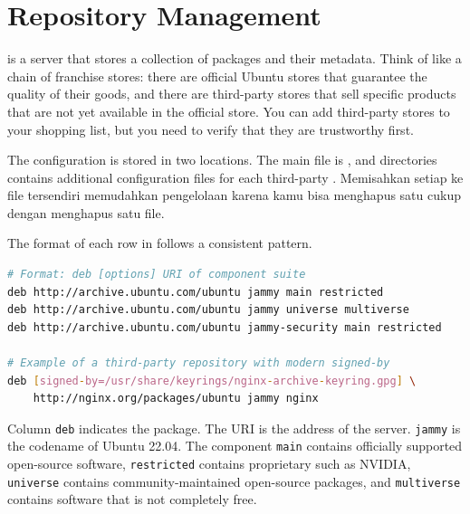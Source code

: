 \section{Repository Management}
\label{sec:repository-management}

 is a server that stores a collection of packages and their metadata.
Think of  like a chain of franchise stores: there are official Ubuntu stores that guarantee the quality of their goods, and there are third-party stores that sell specific products that are not yet available in the official store. You can add third-party stores to your shopping list, but you need to verify that they are trustworthy first.

The  configuration is stored in two locations. The main file is
, and  directories
contains additional configuration files for each third-party . Memisahkan setiap  ke file tersendiri memudahkan pengelolaan karena kamu bisa menghapus satu  cukup dengan menghapus satu file.

The format of each row in  follows a consistent pattern.

\begin{lstlisting}[language=bash, caption={sources.list entry format and examples}]
# Format: deb [options] URI of component suite
deb http://archive.ubuntu.com/ubuntu jammy main restricted
deb http://archive.ubuntu.com/ubuntu jammy universe multiverse
deb http://archive.ubuntu.com/ubuntu jammy-security main restricted

# Example of a third-party repository with modern signed-by
deb [signed-by=/usr/share/keyrings/nginx-archive-keyring.gpg] \
    http://nginx.org/packages/ubuntu jammy nginx
\end{lstlisting}

Column \texttt{deb} indicates the  package. The URI is the address of the  server.
\texttt{jammy} is the codename of Ubuntu 22.04. The component \texttt{main} contains
officially supported open-source software, \texttt{restricted} contains proprietary  such as NVIDIA, \texttt{universe} contains community-maintained open-source packages, and \texttt{multiverse} contains software that is not completely free.

